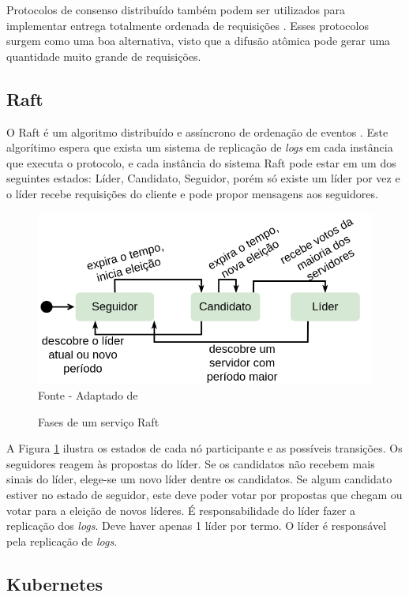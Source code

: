 \documentclass[12pt]{article}
\begin{document}
Protocolos de consenso distribuído também podem ser utilizados para implementar entrega totalmente ordenada de requisições \cite{conf/dsn/EkwallS06, MilosevicHutleSchiper2011}. Esses protocolos surgem como uma boa alternativa, visto que a difusão atômica pode gerar uma quantidade muito grande de requisições.

\subsection{Raft}

O Raft é um algoritmo distribuído e assíncrono de ordenação de eventos \cite{raft}. Este algorítimo espera que exista um sistema de replicação de \textit{logs} em cada instância que executa o protocolo, e cada instância do sistema Raft pode estar em um dos seguintes estados: Líder, Candidato, Seguidor, porém só existe um líder por vez e o líder recebe requisições do cliente e pode propor mensagens aos seguidores.

\begin{figure}[htb!]
\centering
\caption{Fases de um serviço Raft}
\includegraphics[width=0.75\linewidth]{raft-states.drawio.png}
\label{fig:raft}
{\flushleft Fonte - Adaptado de \cite{raft}}
\end{figure}

A Figura \ref{fig:raft} ilustra os estados de cada nó participante e as possíveis transições. Os seguidores reagem às propostas do líder. Se os candidatos não recebem mais sinais do líder, elege-se um novo líder dentre os candidatos. Se algum candidato estiver no estado de seguidor, este deve poder votar por propostas que chegam ou votar para a eleição de novos líderes. É responsabilidade do líder fazer a replicação dos \textit{logs}. Deve haver apenas 1 líder por termo. O líder é responsável pela replicação de \textit{logs}.

\subsection{Kubernetes}
\end{document}

